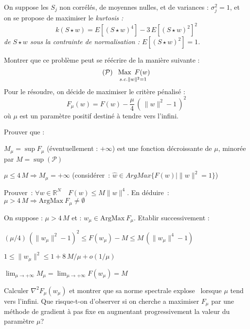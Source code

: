 \documentclass[12pt,a4paper,fleqn]{report}
\newcommand{\R}{\mathbb R}
\newcommand{\hess}{\nabla^2}
\newcommand{\on}{\begin{displaymath}}
\newcommand{\off}{\end{displaymath}}
\renewcommand{\P}{\mathcal P}
\newcommand{\push}[1]{\rule{0pt}{0pt}\hspace{#1pt}}
\begin{document}
\begin{exercice}
On suppose les $S_j$ non corrélés, de moyennes nulles, et de variances :  $\sigma_j^2=1$, et on se propose de maximiser le \it kurtosis \rm :
\on  k(S\star w)= E[(S\star w)^4] -3\,E[(S\star w)^2] ^2 \off
de $S\star w$  sous la contrainte de normalisation : \mbox{$E[(S\star w)^2]=1$}.
  \begin{questions}
  \item Montrer que ce problème peut se réécrire de la manière suivante :
    \on ( \P)  \push{5} \underset{ s. c. \|w\|^2=1}{\push
      3\mbox{Max}\push 5 F(w)}  \off
     Pour le résoudre, on décide de maximiser le critère  pénalisé :
 \on F_{\mu}(w)=F(w)-\frac{\mu}{4}\,\left(\,\|w\|^2-1\,\right)^2 \off
 où $\mu$ est un paramètre positif destiné à tendre vers l'infini.
\item Prouver que :
\begin{subquestions}
\item$M_{\mu}= \sup F_{\mu}$ (éventuellement : $+\infty$) est une fonction décroissante de $\mu$, minorée par $M=\sup (\P)$
\item $\mu\leq 4\,M \Rightarrow M_{\mu}=+\infty$ (considérer~: $\hat w\in ArgMax \{F(w)   |   \|w\|^2=1   \}$)
\item Prouver~: $\forall w\in\R^N \quad F(w)\leq M \|w\|^4$. En déduire~: $\mu> 4\,M \Rightarrow \mathrm{ArgMax}\ F_{\mu} \neq \emptyset$
\end{subquestions}
\item On suppose : $\mu> 4\,M$ et : $w_{\mu}\in\mathrm{ArgMax}\ F_{\mu}$. Etablir successivement :
\begin{subquestions}
\item $ (\mu/4)\,(\|w_{\mu}\|^2-1)^2 \leq F(w_{\mu})-M\leq M\,(\|w_{\mu}\|^4-1)$
\item $1\leq \|w_{\mu}\|^2\leq 1+8\,M/\mu +o(1/\mu)$
\item $\lim_{\mu\rightarrow +\infty} M_{\mu}=\lim_{\mu\rightarrow +\infty} F(w_{\mu})= M$
\end{subquestions}
\item Calculer $\hess F_{\mu}(w_{\mu})$ et montrer que sa norme spectrale  \og explose \fg\  lorsque $\mu$ tend vers l'infini.
Que risque-t-on d'observer si on cherche a maximiser $F_{\mu}$ par une méthode de gradient à pas fixe en augmentant progressivement la valeur du paramètre $\mu$?
\end{questions}
\end{exercice}
\end{document}
